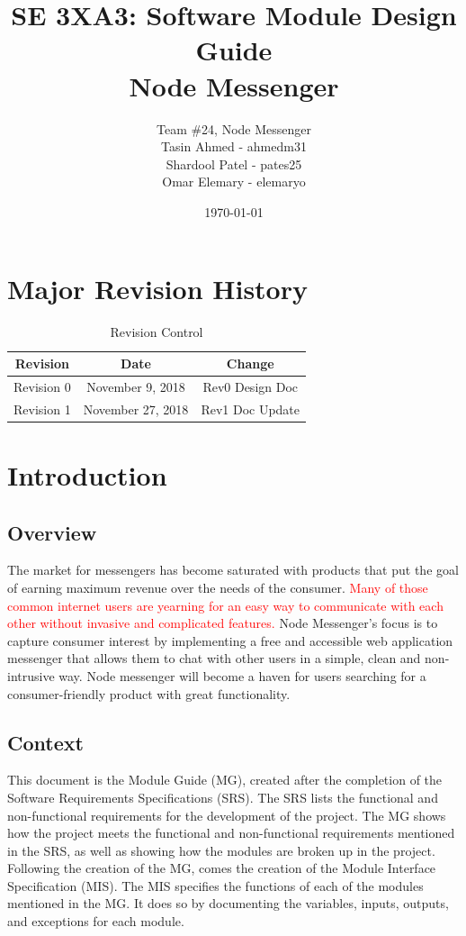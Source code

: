\documentclass[12pt, titlepage]{article}
\title{SE 3XA3: Software Module Design Guide\\Node Messenger}
\author{Team \#24, Node Messenger
		\\ Tasin Ahmed - ahmedm31
		\\ Shardool Patel - pates25
		\\ Omar Elemary - elemaryo
}
\date{\today}
\begin{document}
\maketitle

\tableofcontents
\listoftables
\listoffigures

\section{Major Revision History}
\begin{table}[h!]
\centering
\begin{tabular}{ccc}
\hline 
Revision & Date & Change \\ 
\hline 
Revision 0 & November 9, 2018 & Rev0 Design Doc \\ 
Revision 1 & November 27, 2018 & Rev1 Doc Update \\ 
\hline 
\end{tabular} 
\caption{Revision Control}
\label{my-label}
\end{table}


\section{Introduction}
\subsection{Overview}
The market for messengers has become saturated with products that put the goal of earning maximum revenue over the needs of the consumer. \textcolor{red}{Many of those common internet users are yearning for an easy way to communicate with each other without invasive and complicated features.} Node Messenger's focus is to capture consumer interest by implementing a free and accessible web application messenger that allows them to chat with other users in a simple, clean and non-intrusive way. Node messenger will become a haven for users searching for a consumer-friendly product with great functionality.

\subsection{Context}
This document is the Module Guide (MG), created after the completion of the Software Requirements Specifications (SRS). The SRS lists the functional and non-functional requirements for the development of the project. The MG shows how the project meets the functional and non-functional requirements mentioned in the SRS, as well as showing how the modules are broken up in the project. Following the creation of the MG, comes the creation of the Module Interface Specification (MIS). The MIS specifies the functions of each of the modules mentioned in the MG. It does so by documenting the variables, inputs, outputs, and exceptions for each module. 
\end{document}

